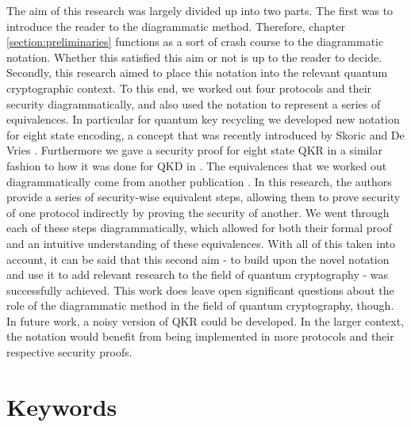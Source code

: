 \documentclass[]{article}
\begin{document}
The aim of this research was largely divided up into two parts. The first was to introduce the reader to the diagrammatic method. Therefore, chapter \ref{section:preliminaries} functions as a sort of crash course to the diagrammatic notation. Whether this satisfied this aim or not is up to the reader to decide. Secondly, this research aimed to place this notation into the relevant quantum cryptographic context. To this end, we worked out four protocols and their security diagrammatically, and also used the notation to represent a series of equivalences. In particular for quantum key recycling we developed new notation for eight state encoding, a concept that was recently introduced by Skoric and De Vries \cite{DeVries2016}. Furthermore we gave a security proof for eight state QKR in a similar fashion to how it was done for QKD in \cite{Kissinger2017}. The equivalences that we worked out diagrammatically come from another publication \cite{Leermakers2019}. In this research, the authors provide a series of security-wise equivalent steps, allowing them to prove security of one protocol indirectly by proving the security of another. We went through each of these steps diagrammatically, which allowed for both their formal proof and an intuitive understanding of these equivalences. With all of this taken into account, it can be said that this second aim - to build upon the novel notation and use it to add relevant research to the field of quantum cryptography - was successfully achieved. This work does leave open significant questions about the role of the diagrammatic method in the field of quantum cryptography, though. In future work, a noisy version of QKR could be developed. In the larger context, the notation would benefit from being implemented in more protocols and their respective security proofs.




\appendix


\section{Keywords}
\label{Keywords}
\end{document}
